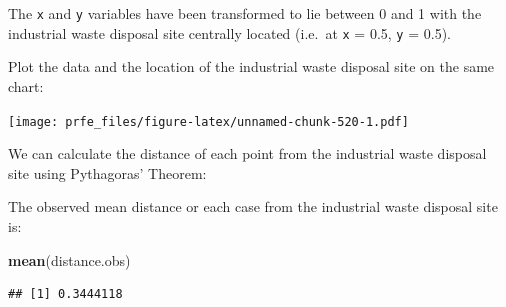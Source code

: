\documentclass[12pt,a4paper]{book}
\newenvironment{Shaded}{\begin{snugshade}}{\end{snugshade}}
\newcommand{\DataTypeTok}[1]{\textcolor[rgb]{0.13,0.29,0.53}{#1}}
\newcommand{\DecValTok}[1]{\textcolor[rgb]{0.00,0.00,0.81}{#1}}
\newcommand{\FloatTok}[1]{\textcolor[rgb]{0.00,0.00,0.81}{#1}}
\newcommand{\KeywordTok}[1]{\textcolor[rgb]{0.13,0.29,0.53}{\textbf{#1}}}
\newcommand{\NormalTok}[1]{#1}
\newcommand{\OperatorTok}[1]{\textcolor[rgb]{0.81,0.36,0.00}{\textbf{#1}}}
\newcommand{\StringTok}[1]{\textcolor[rgb]{0.31,0.60,0.02}{#1}}
\theoremstyle{definition}
\theoremstyle{definition}
\theoremstyle{definition}
\theoremstyle{remark}
\begin{document}
The \texttt{x} and \texttt{y} variables have been transformed to lie
between 0 and 1 with the industrial waste disposal site centrally
located (i.e.~at \texttt{x} = 0.5, \texttt{y} = 0.5).

Plot the data and the location of the industrial waste disposal site on
the same chart:

\begin{Shaded}
\end{Shaded}

\texttt{[image: prfe\_files/figure-latex/unnamed-chunk-520-1.pdf]}

We can calculate the distance of each point from the industrial waste
disposal site using Pythagoras' Theorem:

\begin{Shaded}
\end{Shaded}

The observed mean distance or each case from the industrial waste
disposal site is:

\begin{Shaded}
\begin{Highlighting}[]
\KeywordTok{mean}\NormalTok{(distance.obs)}
\end{Highlighting}
\end{Shaded}

\begin{verbatim}
## [1] 0.3444118
\end{verbatim}
\end{document}
